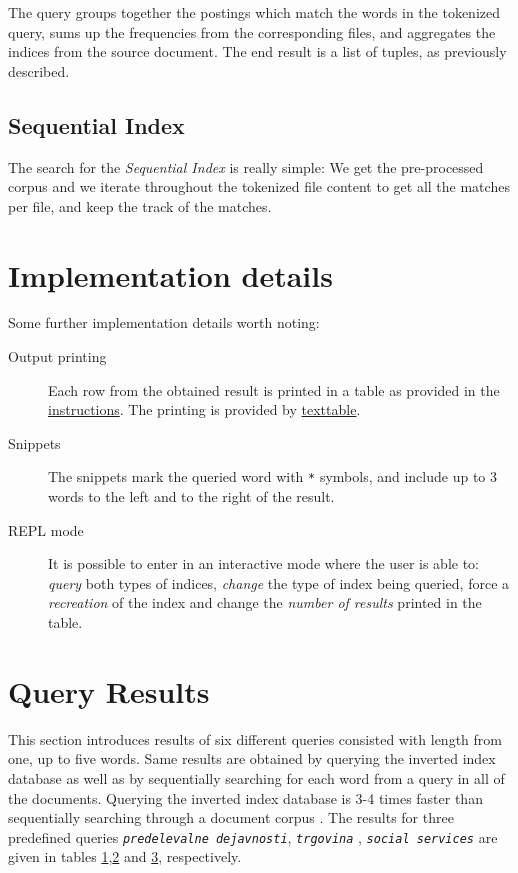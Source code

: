 \documentclass{article}
\begin{document}
	The query groups together the postings which match the words in the tokenized query, sums up the frequencies from the corresponding files, and aggregates the indices from the source document. The end result is a list of tuples, as previously described.
	
	\subsection{Sequential Index}
	The search for the \textit{Sequential Index} is really simple: We get the pre-processed corpus and we iterate throughout the tokenized file content to get all the matches per file, and keep the track of the matches.
	
	\section{Implementation details}
	Some further implementation details worth noting:
	\begin{description}
		\item[Output printing] Each row from the obtained result is printed in a table as provided in the \href{http://zitnik.si/teaching/wier/PA3.html}{instructions}. The printing is provided by \href{https://pypi.org/project/texttable/}{texttable}.
		
		\item[Snippets] The snippets mark the queried word with \texttt{*} symbols, and include up to 3 words to the left and to the right of the result.
		
		\item[REPL mode] It is possible to enter in an interactive mode where the user is able to: \textit{query} both types of indices, \textit{change} the type of index being queried, force a \textit{recreation} of the index and change the \textit{number of results} printed in the table.
	\end{description}
	
	\section{Query Results}
	This section introduces results of six different queries consisted with length from one, up to five words. Same results are obtained by querying the inverted index database as well as by sequentially searching for each word from a query in all of the documents. Querying the inverted index database is 3-4 times faster than sequentially searching through a document corpus . The results for three predefined queries \texttt{\textit{predelevalne dejavnosti}}, \texttt{\textit{trgovina}} , \texttt{\textit{social services}} are given in tables \hyperref[tab:1]{1},\hyperref[tab:2]{2} and \hyperref[tab:3]{3}, respectively.
	
\end{document}
